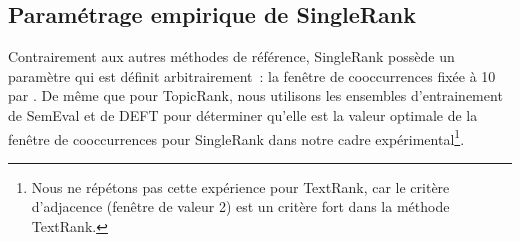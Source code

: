   \subsection{Paramétrage empirique de SingleRank}
  \label{subsec:parametrage_empirique_de_singlerank}
    Contrairement aux autres méthodes de référence, SingleRank possède un
    paramètre qui est définit arbitrairement~: la fenêtre de cooccurrences fixée
    à 10 par . De même que pour TopicRank, nous
    utilisons les ensembles d'entrainement de SemEval et de DEFT pour déterminer
    qu'elle est la valeur optimale de la fenêtre de cooccurrences pour
    SingleRank dans notre cadre expérimental\footnote{Nous ne répétons pas cette
    expérience pour TextRank, car le critère d'adjacence (fenêtre de valeur 2)
    est un critère fort dans la méthode TextRank.}.

